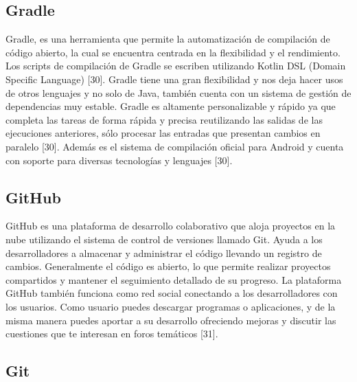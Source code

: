 \subsection{Gradle}

\begin{list}{}%
    {\setlength{\leftmargin}{1cm}\setlength{\rightmargin}{1cm}}
    \item\relax
    \small

Gradle, es una herramienta que permite la automatización de compilación de código abierto, la cual se encuentra centrada en la flexibilidad y el rendimiento. Los scripts de compilación de Gradle se escriben utilizando Kotlin DSL (Domain Specific Language) [30].
Gradle tiene una gran flexibilidad y nos deja hacer usos de otros lenguajes y no solo de Java, también cuenta con un sistema de gestión de dependencias muy estable. Gradle es altamente personalizable y rápido ya que completa las tareas de forma rápida y precisa reutilizando las salidas de las ejecuciones anteriores, sólo procesar las entradas que presentan cambios en paralelo [30].
Además es el sistema de compilación oficial para Android y cuenta con soporte para diversas tecnologías y lenguajes [30].

\end{list}


\subsection{GitHub}

\begin{list}{}%
    {\setlength{\leftmargin}{1cm}\setlength{\rightmargin}{1cm}}
    \item\relax
    \small

GitHub es una plataforma de desarrollo colaborativo que aloja proyectos en la nube utilizando el sistema de control de versiones llamado Git. Ayuda a los desarrolladores a almacenar y administrar el código llevando un registro de cambios. Generalmente el código es abierto, lo que permite realizar proyectos compartidos y mantener el seguimiento detallado de su progreso. La plataforma GitHub también funciona como red social conectando a los desarrolladores con los usuarios. Como usuario puedes descargar programas o aplicaciones, y de la misma manera puedes aportar a su desarrollo ofreciendo mejoras y discutir las cuestiones que te interesan en foros temáticos [31].
\end{list}

\subsection{Git}

